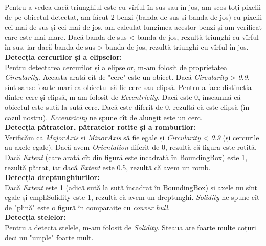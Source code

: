 \documentclass[12pt]{article}
\begin{document}
Pentru a vedea dacă triunghiul este cu vîrful în sus sau în jos, am scos toți pixelii
de pe obiectul detectat, am făcut 2 benzi (banda de sus și banda de jos) cu pixelii cei
mai de sus și cei mai de jos, am calculat lungimea acestor benzi și am verificat care este
mai mare. Dacă banda de sus < banda de jos, rezultă triunghi cu vîrful în sus, iar dacă
banda de sus > banda de jos, rezultă triunghi cu vîrful în jos. \\

\textbf{Detecția cercurilor și a elipselor:} \\
\indent Pentru detectarea cercurilor și a elipselor, m-am folosit de proprietatea
\emph{Circularity}. Aceasta arată cît de "cerc" este un obiect. Dacă \emph{Circularity} 
> \emph{0.9}, sînt șanse foarte mari ca obiectul să fie cerc sau elipsă. Pentru a 
face distincția dintre cerc și elipsă, m-am folosit de \emph{Eccentricity}. Dacă este 0,
înseamnă că obiectul este sută la sută cerc. Dacă este diferit de 0, rezultă că este elipsă
(în cazul nostru). \emph{Eccentricity} ne spune cît de alungit este un cerc. \\

\textbf{Detecția pătratelor, pătratelor rotite și a romburilor:} \\
\indent Verificăm ca \emph{MajorAxis} și \emph{MinorAxis} să fie egale și \emph{Circularity} <
\emph{0.9} (și cercurile au axele egale). Dacă avem \emph{Orientation} diferit de 0, rezultă
că figura este rotită. Dacă \emph{Extent} (care arată cît din figură este încadrată în BoundingBox)
este 1, rezultă pătrat, iar dacă \emph{Extent} este 0.5, rezultă că avem un romb. \\

\textbf{Detecția dreptunghiurilor:} \\
\indent Dacă \emph{Extent} este 1 (adică sută la sută încadrat în BoundingBox) și axele nu sînt
egale și emph{Solidity} este 1, rezultă că avem un dreptunghi. \emph{Solidity} ne spune
cît de "plină" este o figură în comparaițe cu \emph{convex hull}. \\

\textbf{Detecția stelelor:} \\
\indent Pentru a detecta stelele, m-am folosit de \emph{Solidity}. Steaua are foarte multe coțuri
deci nu "umple" foarte mult.
\end{document}

